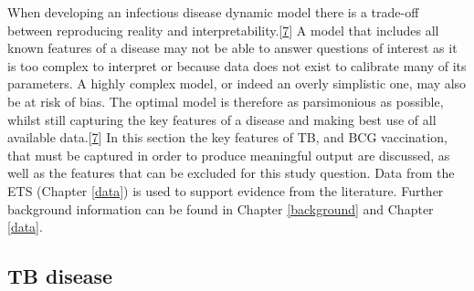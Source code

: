 \documentclass[11pt,twoside]{bristolthesis}
\begin{document}
  When developing an infectious disease dynamic model there is a trade-off between reproducing reality and interpretability.{[}\protect\hyperlink{ref-Anderson1991}{7}{]} A model that includes all known features of a disease may not be able to answer questions of interest as it is too complex to interpret or because data does not exist to calibrate many of its parameters. A highly complex model, or indeed an overly simplistic one, may also be at risk of bias. The optimal model is therefore as parsimonious as possible, whilst still capturing the key features of a disease and making best use of all available data.{[}\protect\hyperlink{ref-Anderson1991}{7}{]} In this section the key features of TB, and BCG vaccination, that must be captured in order to produce meaningful output are discussed, as well as the features that can be excluded for this study question. Data from the ETS (Chapter \ref{data}) is used to support evidence from the literature. Further background information can be found in Chapter \ref{background} and Chapter \ref{data}.
  
  \hypertarget{tb-disease}{%
  \subsection{TB disease}\label{tb-disease}}
  
\end{document}
